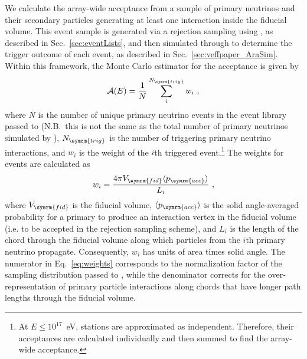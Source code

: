       We calculate the array-wide acceptance from a sample of primary neutrinos and their secondary particles generating at least one interaction inside the fiducial volume.
      This event sample is generated via a rejection sampling using \nuleptonsim{}, as described in Sec.~\ref{sec:eventLists}, and then simulated through  \arasim{} to determine the trigger outcome of each event, as described in Sec.~\ref{sec:veffpaper_AraSim}.
      Within this framework, the Monte Carlo estimator for the acceptance is given by
      \begin{align}\label{eq:acceptance}
          \mathcal{A}(E) = \frac{1}{N} \sum_i^{N_{\symrm{trig}}} w_i~,
      \end{align}
      where $N$ is the number of unique primary neutrino events in the event library passed to \arasim{} (N.B.\ this is not the same as the total number of primary neutrinos simulated by \nuleptonsim{}), $N_{\symrm{trig}}$ is the number of triggering primary neutrino interactions, and $w_i$ is the weight of the $i$th triggered event.\footnote{
        At $E\leq 10^{17}$~eV, stations are approximated as independent.
        Therefore, their acceptances are calculated individually and then summed to find the array-wide acceptance.
      } 
      The weights for events are calculated as
      \begin{align}\label{eq:weights}
          w_i = \frac{4\pi V_{\symrm{fid}} \langle p_{\symrm{acc}} \rangle}{L_i}~,
      \end{align}
      where $V_{\symrm{fid}}$ is the fiducial volume, $\langle p_{\symrm{acc}} \rangle$ is the solid angle-averaged probability for a primary to produce an interaction vertex in the fiducial volume (i.e.
      to be accepted in the rejection sampling scheme), and $L_i$ is the length of the chord through the fiducial volume along which particles from the $i$th primary neutrino propagate.
      Consequently, $w_i$ has units of area times solid angle.
      The numerator in Eq.~\eqref{eq:weights} corresponds to the normalization factor of the sampling distribution passed to \arasim{}, while the denominator corrects for the over-representation of primary particle interactions along chords that have longer path lengths through the fiducial volume.
      
